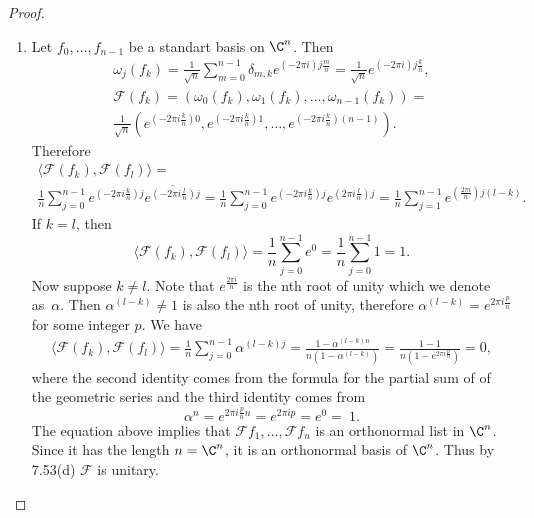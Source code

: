 \documentclass{extarticle}
\begin{document}
\begin{proof}
    \begin{enumerate}[label=(\alph*)]
    \item Let \( f_0, \ldots, f_{n-1} \) be a standart basis on \( \C^n \). Then
    \begin{gather*}
        \omega_j(f_k) = \frac{1}{\sqrt{n}} \sum_{m=0}^{n-1}
        {\delta_{m, k} e^{(-2 \pi i) j \frac{m}{n}} } =
        \frac{1}{\sqrt{n}} e^{(-2 \pi i) j \frac{k}{n}},\\
        \mathcal{F}(f_k) = (\omega_0(f_k), \omega_1(f_k), \ldots, \omega_{n-1}(f_k)) = \\
        \frac{1}{\sqrt{n}}
        (e^{(-2 \pi i \frac{k}{n}) 0}, e^{(-2 \pi i \frac{k}{n}) 1},
        \ldots, e^{(-2 \pi i \frac{k}{n})(n-1)}).
    \end{gather*}
    Therefore
    \begin{gather*}
        \langle \mathcal{F}(f_k), \mathcal{F}(f_l) \rangle = \\
        \frac{1}{n}
        \sum_{j=0}^{n-1} e^{(-2 \pi i \frac{k}{n})j }
        \overline{e^{(-2 \pi i \frac{l}{n}) j}}
        =
        \frac{1}{n}
        \sum_{j=0}^{n-1} e^{(-2 \pi i \frac{k}{n})j }
        e^{(2 \pi i \frac{l}{n}) j}
        =
        \frac{1}{n}
        \sum_{j=1}^{n-1} e^{(\frac{2 \pi i}{n})j(l-k)}.
    \end{gather*}
    If \( k = l \), then
    \begin{equation*}
        \langle \mathcal{F}(f_k), \mathcal{F}(f_l) \rangle =
        \frac{1}{n}
        \sum_{j=0}^{n-1} e^{0}
        =
        \frac{1}{n}
        \sum_{j=0}^{n-1} 1 = 1.
    \end{equation*}
    Now suppose \( k \ne l \).
    Note that \( e^{\frac{2 \pi i}{n}} \) is the nth root of unity which we denote as~\( \alpha \).
    Then \( \alpha^{(l-k)}  \ne 1 \) is also the nth root of unity,
    therefore \( \alpha^{(l -k)} = e^{2 \pi i \frac{p}{n}} \) for some integer \( p \).
    We have
    \begin{gather*}
        \langle \mathcal{F}(f_k), \mathcal{F}(f_l) \rangle =
        \frac{1}{n}
        \sum_{j=0}^{n-1} \alpha^{(l-k)j}
        =
        \frac{1 - \alpha^{(l-k)n}}{n (1 - \alpha^{(l-k)})}
        =
        \frac{1 - 1}{n (1 - e^{2 \pi i \frac{p}{n}})}
        = 0,
    \end{gather*}
    where the second identity comes from the formula for the partial sum of of the geometric series
    and the third identity comes from
    \begin{equation*}
    \alpha^n =  e^{2 \pi i \frac{p}{n} n } =
    e^{2 \pi i p} = e^0 =~1.
    \end{equation*}
    The equation above implies that
    \( \mathcal{F} f_1, \dots, \mathcal{F} f_n\) is an orthonormal list in \( \C^n \).
    Since it has the length \( n = \C^n \), it is an orthonormal basis of \( \C^n \).
    Thus by 7.53(d) \(  \mathcal{F} \) is unitary.


\end{enumerate}
\end{proof}
\end{document}
